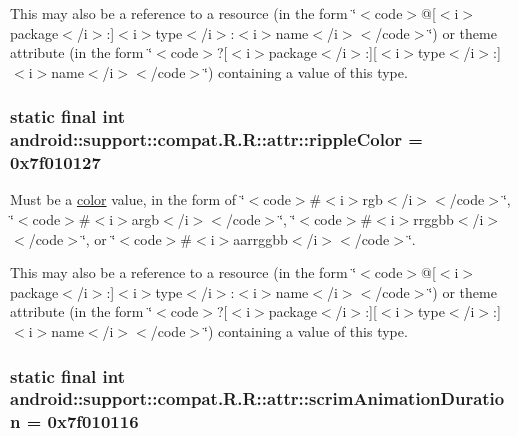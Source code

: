 This may also be a reference to a resource (in the form \char`\"{}$<$code$>$@\mbox{[}$<$i$>$package$<$/i$>$:\mbox{]}$<$i$>$type$<$/i$>$:$<$i$>$name$<$/i$>$$<$/code$>$\char`\"{}) or theme attribute (in the form \char`\"{}$<$code$>$?\mbox{[}$<$i$>$package$<$/i$>$:\mbox{]}\mbox{[}$<$i$>$type$<$/i$>$:\mbox{]}$<$i$>$name$<$/i$>$$<$/code$>$\char`\"{}) containing a value of this type. \hypertarget{classandroid_1_1support_1_1compat_1_1_r_1_1attr_aa107f372d1ca507bdd9a2a9732489c5}{
\subsubsection[{rippleColor}]{\setlength{\rightskip}{0pt plus 5cm}static final int android::support::compat.R.R::attr::rippleColor = 0x7f010127}}
\label{classandroid_1_1support_1_1compat_1_1_r_1_1attr_aa107f372d1ca507bdd9a2a9732489c5}


Must be a \hyperlink{classandroid_1_1support_1_1compat_1_1_r_1_1color}{color} value, in the form of \char`\"{}$<$code$>$\#$<$i$>$rgb$<$/i$>$$<$/code$>$\char`\"{}, \char`\"{}$<$code$>$\#$<$i$>$argb$<$/i$>$$<$/code$>$\char`\"{}, \char`\"{}$<$code$>$\#$<$i$>$rrggbb$<$/i$>$$<$/code$>$\char`\"{}, or \char`\"{}$<$code$>$\#$<$i$>$aarrggbb$<$/i$>$$<$/code$>$\char`\"{}. 

This may also be a reference to a resource (in the form \char`\"{}$<$code$>$@\mbox{[}$<$i$>$package$<$/i$>$:\mbox{]}$<$i$>$type$<$/i$>$:$<$i$>$name$<$/i$>$$<$/code$>$\char`\"{}) or theme attribute (in the form \char`\"{}$<$code$>$?\mbox{[}$<$i$>$package$<$/i$>$:\mbox{]}\mbox{[}$<$i$>$type$<$/i$>$:\mbox{]}$<$i$>$name$<$/i$>$$<$/code$>$\char`\"{}) containing a value of this type. \hypertarget{classandroid_1_1support_1_1compat_1_1_r_1_1attr_db686c45fdc390c4bc4835decf5ce72d}{
\subsubsection[{scrimAnimationDuration}]{\setlength{\rightskip}{0pt plus 5cm}static final int android::support::compat.R.R::attr::scrimAnimationDuration = 0x7f010116}}
\label{classandroid_1_1support_1_1compat_1_1_r_1_1attr_db686c45fdc390c4bc4835decf5ce72d}


